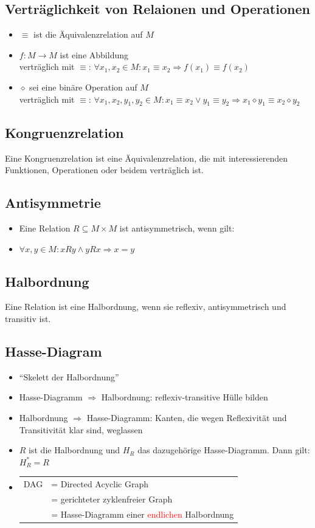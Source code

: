 \documentclass[a4paper,portrait]{scrartcl}
\begin{document}
\subsection{Verträglichkeit von Relaionen und Operationen}
\begin{itemize}
\item $ \equiv $ ist die Äquivalenzrelation auf $ M $
\item $ f: M \rightarrow M $ ist eine Abbildung \\
verträglich mit $ \equiv $: $ \forall x_{1}, x_{2} \in M: x_{1} \equiv x_{2} \Rightarrow f(x_{1}) \equiv f(x_{2}) $
\item $\diamond$ sei eine binäre Operation auf $M$ \\
verträglich mit $ \equiv $: $ \forall x_{1}, x_{2}, y_{1}, y_{2} \in M: x_{1} \equiv x_{2} \vee y_{1} \equiv y_{2} \Rightarrow x_{1} \diamond y_{1} \equiv x_{2} \diamond y_{2} $
\end{itemize}
\subsection{Kongruenzrelation}
Eine Kongruenzrelation ist eine Äquivalenzrelation, die mit  interessierenden Funktionen, Operationen oder beidem verträglich ist.
\subsection{Antisymmetrie}
\begin{itemize}
\item Eine Relation $ R \subseteq M \times M $ ist antisymmetrisch, wenn gilt:
\item $ \forall x,y \in M: xRy \wedge yRx \Rightarrow x = y $
\end{itemize}
\subsection{Halbordnung}
Eine Relation ist eine Halbordnung, wenn sie reflexiv, antisymmetrisch und transitiv ist.
\subsection{Hasse-Diagram}
\begin{itemize}
\item ``Skelett der Halbordnung''
\item Hasse-Diagramm $\Rightarrow$ Halbordnung: reflexiv-transitive Hülle bilden
\item Halbordnung $\Rightarrow$ Hasse-Diagramm: Kanten, die wegen Reflexivität und Transitivität klar sind, weglassen
\item $R$ ist die Halbordnung und $H_{R}$ das dazugehörige Hasse-Diagramm. Dann gilt: $ H_{R}^{*} = R $
\item 
\begin{tabular}{ll}
DAG &= Directed Acyclic Graph \\
&= gerichteter zyklenfreier Graph\\
&= Hasse-Diagramm einer \textcolor{red}{endlichen} Halbordnung
\end{tabular}
\end{itemize}
\end{document}
